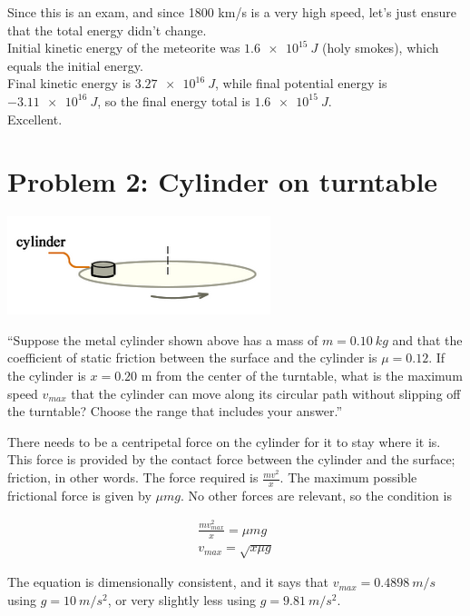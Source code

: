 \documentclass[8.01x]{subfiles}
\begin{document}
Since this is an exam, and since 1800 km/s is a very high speed, let's just ensure that the total energy didn't change.\\
Initial kinetic energy of the meteorite was $\SI{1.6e15}{J}$ (holy smokes), which equals the initial energy.\\
Final kinetic energy is $\SI{3.27e16}{J}$, while final potential energy is $\SI{-3.11e16}{J}$, so the final energy total is $\SI{1.6e15}{J}$.\\
Excellent.

\section{Problem 2: Cylinder on turntable}

\begin{center}
\includegraphics[scale=0.8]{Graphics/midterm2p2}
\end{center}

``Suppose the metal cylinder shown above has a mass of $m = \SI{0.10}{kg}$ and that the coefficient of static friction between the surface and the cylinder is $\mu = 0.12$. If the cylinder is $x = 0.20$ m from the center of the turntable, what is the maximum speed $v_{max}$ that the cylinder can move along its circular path without slipping off the turntable? Choose the range that includes your answer.''

There needs to be a centripetal force on the cylinder for it to stay where it is. This force is provided by the contact force between the cylinder and the surface; friction, in other words. The force required is $\displaystyle \frac{m v^2}{x}$. The maximum possible frictional force is given by $\mu m g$. No other forces are relevant, so the condition is

\begin{align}
\frac{m v_{max}^2}{x} = \mu m g\\
v_{max} = \sqrt{x \mu g}
\end{align}

The equation is dimensionally consistent, and it says that $v_{max} = \SI{0.4898}{m/s}$ using $g = \SI{10}{m/s^2}$, or very slightly less using $g = \SI{9.81}{m/s^2}$.
\end{document}
